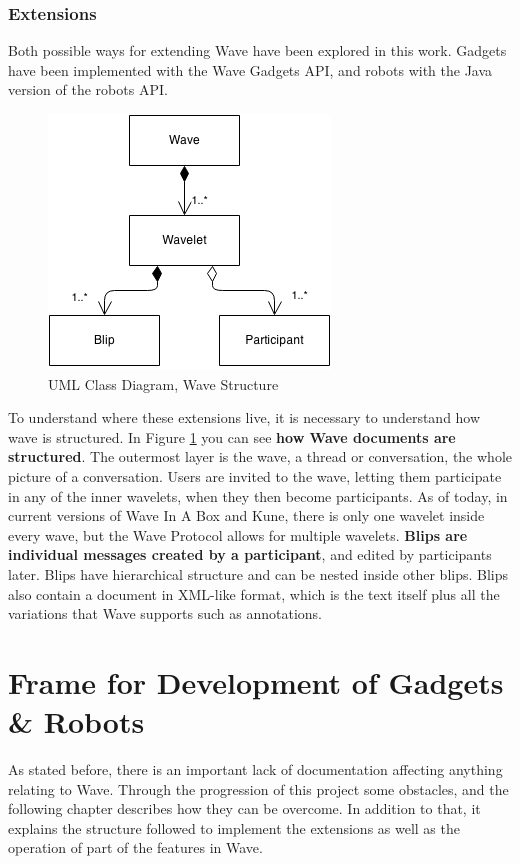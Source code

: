 \subsection{Extensions}
Both possible ways for extending Wave have been explored in this work. Gadgets have been implemented with the Wave Gadgets API, and robots with the Java version of the robots API.
\begin{figure}[h]
  \center
    \includegraphics[keepaspectratio, scale=0.7]{Media/Diagrams/Wave/Structure.png}
  \caption{UML Class Diagram, Wave Structure}
  \label{fig:wave_structure}
\end{figure}
To understand where these extensions live, it is necessary to understand how wave is structured. In Figure \ref{fig:wave_structure} you can see \textbf{how Wave documents are structured}. The outermost layer is the wave, a thread or conversation, the whole picture of a conversation. Users are invited to the wave, letting them participate in any of the inner wavelets, when they then become participants. As of today, in current versions of Wave In A Box and Kune, there is only one wavelet inside every wave, but the Wave Protocol allows for multiple wavelets. \textbf{Blips are individual messages created by a participant}, and edited by participants later. Blips have hierarchical structure and can be nested inside other blips. Blips also contain a document in XML-like format, which is the text itself plus all the variations that Wave supports such as annotations.

\chapter{Frame for Development of Gadgets \& Robots}
As stated before, there is an important lack of documentation affecting anything relating to Wave. Through the progression of this project some obstacles, and the following chapter describes how they can be overcome. In addition to that, it explains the structure followed to implement the extensions as well as the operation of part of the features in Wave.
